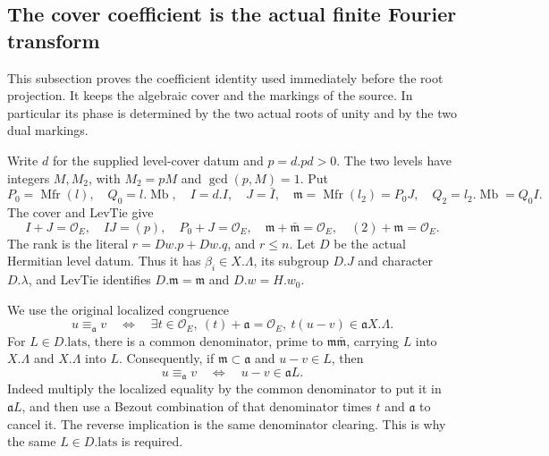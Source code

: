\subsection{The cover coefficient is the actual finite Fourier transform}
\label{subsec:ftb-cover-finite-fourier}

This subsection proves the coefficient identity used immediately
before the root projection. It keeps the algebraic cover and the
markings of the source. In particular its phase is determined by
the two actual roots of unity and by the two dual markings.

Write \(d\) for the supplied level-cover datum and \(p=d.pd>0\).
The two levels have integers \(M,M_2\), with
\(M_2=pM\) and \(\gcd(p,M)=1\). Put
\[
 P_0=\operatorname{Mfr}(l),\quad Q_0=l.\operatorname{Mb},
 \quad I=d.I,\quad J=\bar I,\quad
 \mathfrak m=\operatorname{Mfr}(l_2)=P_0J,\quad
 Q_2=l_2.\operatorname{Mb}=Q_0I.
\]
The cover and \(\mathrm{LevTie}\) give
\[
 I+J=\mathcal O_E,\quad IJ=(p),\quad
 P_0+J=\mathcal O_E,\quad
 \mathfrak m+\bar{\mathfrak m}=\mathcal O_E,\quad
 (2)+\mathfrak m=\mathcal O_E.                         \tag{CFo1}
\]
The rank is the literal \(r=Dw.p+Dw.q\), and \(r\leq n\).
Let \(D\) be the actual Hermitian level datum. Thus it has
\(\beta_i\in X.\Lambda\), its subgroup \(D.J\) and character
\(D.\lambda\), and \(\mathrm{LevTie}\) identifies
\(D.\mathfrak m=\mathfrak m\) and \(D.w=H.w_0\).

We use the original localized congruence
\[
 u\equiv_{\mathfrak a}v
 \quad\Longleftrightarrow\quad
 \exists t\in\mathcal O_E,\ (t)+\mathfrak a=\mathcal O_E,\
                          t(u-v)\in\mathfrak a X.\Lambda .
                                                               \tag{CFo2}
\]
For \(L\in D.\mathrm{lats}\), there is a common denominator,
prime to \(\mathfrak m\bar{\mathfrak m}\), carrying \(L\) into
\(X.\Lambda\) and \(X.\Lambda\) into \(L\). Consequently, if
\(\mathfrak m\subset\mathfrak a\) and \(u-v\in L\), then
\[
                  u\equiv_{\mathfrak a}v
                   \quad\Longleftrightarrow\quad
                             u-v\in\mathfrak a L.         \tag{CFo3}
\]
Indeed multiply the localized equality by the common denominator
to put it in \(\mathfrak a L\), and then use a Bezout combination
of that denominator times \(t\) and \(\mathfrak a\) to cancel it.
The reverse implication is the same denominator clearing.
This is why the same \(L\in D.\mathrm{lats}\) is required.

